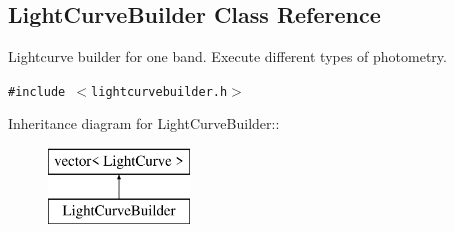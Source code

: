 \subsection{Light\-Curve\-Builder  Class Reference}
\label{class_lightcurvebuilder}
Lightcurve builder for one band. Execute different types of photometry. 


{\tt \#include $<$lightcurvebuilder.h$>$}

Inheritance diagram for Light\-Curve\-Builder::\begin{figure}[H]
\begin{center}
\leavevmode
\includegraphics[height=2cm]{class_lightcurvebuilder}
\end{center}
\end{figure}
